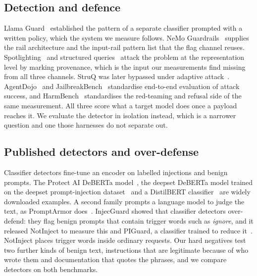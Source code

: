 \documentclass[conference]{IEEEtran}
\begin{document}
\subsection{Detection and defence}
Llama Guard~\cite{inan2023llamaguard} established the pattern of a separate
classifier prompted with a written policy, which the system we measure follows.
NeMo Guardrails~\cite{rebedea2023nemo} supplies the rail architecture and the
input-rail pattern list that the flag channel reuses. Spotlighting~\cite{hines2024spotlighting}
and structured queries~\cite{chen2025struq} attack the problem at the
representation level by marking provenance, which is the input our measurements
find missing from all three channels. StruQ was later bypassed under adaptive
attack~\cite{nasr2025adaptive}. AgentDojo~\cite{debenedetti2024agentdojo} and
JailbreakBench~\cite{chao2024jailbreakbench} standardise end-to-end evaluation
of attack success, and HarmBench~\cite{mazeika2024harmbench} standardises the
red-teaming and refusal side of the same measurement. All three score what a
target model does once a payload reaches it. We evaluate the detector in
isolation instead, which is a narrower question and one those harnesses do not
separate out.

\subsection{Published detectors and over-defense}
Classifier detectors fine-tune an encoder on labelled injections and benign
prompts. The Protect AI DeBERTa model~\cite{protectai2024deberta}, the deepset
DeBERTa model trained on the deepset prompt-injection
dataset~\cite{deepset2023injection, deepset_promptinjections} and a DistilBERT
classifier~\cite{fmops2023distilbert} are widely downloaded examples. A second
family prompts a language model to judge the text, as
PromptArmor does~\cite{shi2025promptarmor}. InjecGuard showed that classifier
detectors over-defend: they flag benign prompts that contain trigger words
such as \emph{ignore}, and it released NotInject to measure this and PIGuard,
a classifier trained to reduce it~\cite{li2024injecguard, piguard2025model}.
NotInject places trigger words inside ordinary requests. Our hard negatives
test two further kinds of benign text, instructions that are legitimate
because of who wrote them and documentation that quotes the phrases, and we
compare detectors on both benchmarks.
\end{document}
